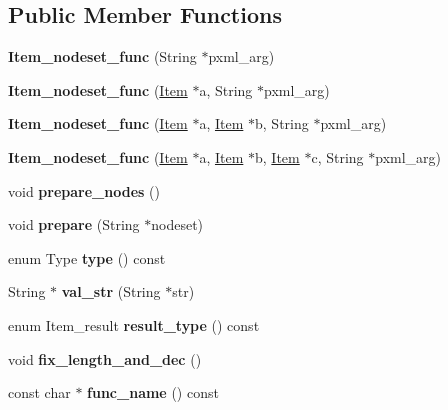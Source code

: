 \subsection*{Public Member Functions}
\begin{DoxyCompactItemize}
\item 
\mbox{\label{classItem__nodeset__func_a16122854c5854d2f343242a03117b6ad}} 
{\bfseries Item\+\_\+nodeset\+\_\+func} (String $\ast$pxml\+\_\+arg)
\item 
\mbox{\label{classItem__nodeset__func_a94f6f2f6cb9e4ce0a25947b180849e9f}} 
{\bfseries Item\+\_\+nodeset\+\_\+func} (\mbox{\hyperlink{classItem}{Item}} $\ast$a, String $\ast$pxml\+\_\+arg)
\item 
\mbox{\label{classItem__nodeset__func_a90c9f1c61e1f3a15d4f75ff4f95d9d1a}} 
{\bfseries Item\+\_\+nodeset\+\_\+func} (\mbox{\hyperlink{classItem}{Item}} $\ast$a, \mbox{\hyperlink{classItem}{Item}} $\ast$b, String $\ast$pxml\+\_\+arg)
\item 
\mbox{\label{classItem__nodeset__func_acb5501e5b609ee9f80583db04e89dd2b}} 
{\bfseries Item\+\_\+nodeset\+\_\+func} (\mbox{\hyperlink{classItem}{Item}} $\ast$a, \mbox{\hyperlink{classItem}{Item}} $\ast$b, \mbox{\hyperlink{classItem}{Item}} $\ast$c, String $\ast$pxml\+\_\+arg)
\item 
\mbox{\label{classItem__nodeset__func_af304a989437ebe30589e4d965d417888}} 
void {\bfseries prepare\+\_\+nodes} ()
\item 
\mbox{\label{classItem__nodeset__func_ae4916997fdf6b284b7187bc3ba05d084}} 
void {\bfseries prepare} (String $\ast$nodeset)
\item 
\mbox{\label{classItem__nodeset__func_a5c920c43870e3fb080131065b05edff4}} 
enum Type {\bfseries type} () const
\item 
\mbox{\label{classItem__nodeset__func_a9337c5e7ea4ecdcaec0444725f1426d0}} 
String $\ast$ {\bfseries val\+\_\+str} (String $\ast$str)
\item 
\mbox{\label{classItem__nodeset__func_a5fff37063a84f9e960652426d8914eb5}} 
enum Item\+\_\+result {\bfseries result\+\_\+type} () const
\item 
\mbox{\label{classItem__nodeset__func_a58a067fa6ad86c585a3131837d8773e6}} 
void {\bfseries fix\+\_\+length\+\_\+and\+\_\+dec} ()
\item 
\mbox{\label{classItem__nodeset__func_a40756c2e87ad7945e484db2d8293983e}} 
const char $\ast$ {\bfseries func\+\_\+name} () const
\end{DoxyCompactItemize}
